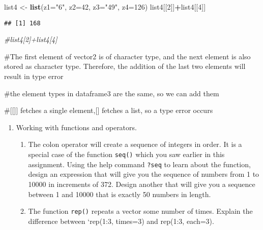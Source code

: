 \documentclass[
]{article}
\newenvironment{Shaded}{\begin{snugshade}}{\end{snugshade}}
\newcommand{\CommentTok}[1]{\textcolor[rgb]{0.56,0.35,0.01}{\textit{#1}}}
\newcommand{\DataTypeTok}[1]{\textcolor[rgb]{0.13,0.29,0.53}{#1}}
\newcommand{\DecValTok}[1]{\textcolor[rgb]{0.00,0.00,0.81}{#1}}
\newcommand{\KeywordTok}[1]{\textcolor[rgb]{0.13,0.29,0.53}{\textbf{#1}}}
\newcommand{\NormalTok}[1]{#1}
\newcommand{\OperatorTok}[1]{\textcolor[rgb]{0.81,0.36,0.00}{\textbf{#1}}}
\newcommand{\StringTok}[1]{\textcolor[rgb]{0.31,0.60,0.02}{#1}}
\providecommand{\tightlist}{%
  \setlength{\itemsep}{0pt}\setlength{\parskip}{0pt}}
\begin{document}
\begin{Shaded}
\begin{Highlighting}[]
\NormalTok{list4 <-}\StringTok{ }\KeywordTok{list}\NormalTok{(}\DataTypeTok{z1=}\StringTok{"6"}\NormalTok{, }\DataTypeTok{z2=}\DecValTok{42}\NormalTok{, }\DataTypeTok{z3=}\StringTok{"49"}\NormalTok{, }\DataTypeTok{z4=}\DecValTok{126}\NormalTok{)}
\NormalTok{list4[[}\DecValTok{2}\NormalTok{]]}\OperatorTok{+}\NormalTok{list4[[}\DecValTok{4}\NormalTok{]]}
\end{Highlighting}
\end{Shaded}

\begin{verbatim}
## [1] 168
\end{verbatim}

\begin{Shaded}
\begin{Highlighting}[]
\CommentTok{#list4[2]+list4[4]}
\end{Highlighting}
\end{Shaded}

\#The first element of vector2 is of character type, and the next
element is also stored as character type. Therefore, the addition of the
last two elements will result in type error

\#the element types in dataframe3 are the same, so we can add them

\#{[}{[}{]}{]} fetches a single element,{[}{]} fetches a list, so a type
error occurs

\begin{enumerate}
\def\labelenumi{\arabic{enumi}.}
\setcounter{enumi}{2}
\tightlist
\item
  Working with functions and operators.

  \begin{enumerate}
  \def\labelenumii{\alph{enumii}.}
  \tightlist
  \item
    The colon operator will create a sequence of integers in order. It
    is a special case of the function \texttt{seq()} which you saw
    earlier in this assignment. Using the help command \texttt{?seq} to
    learn about the function, design an expression that will give you
    the sequence of numbers from 1 to 10000 in increments of 372. Design
    another that will give you a sequence between 1 and 10000 that is
    exactly 50 numbers in length.
  \item
    The function \texttt{rep()} repeats a vector some number of times.
    Explain the difference between `rep(1:3, times=3) and rep(1:3,
    each=3).
  \end{enumerate}
\end{enumerate}
\end{document}
